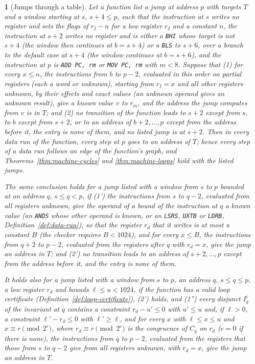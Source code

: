 \documentclass[oneside,english]{amsart}
\numberwithin{equation}{section}
\theoremstyle{plain}
\theoremstyle{definition}
\theoremstyle{plain}
\newtheorem{prop}[thm]{\protect\propositionname}
\theoremstyle{plain}
\theoremstyle{remark}
\providecommand{\propositionname}{Proposition}
\begin{document}
\begin{prop}[Jumps through a table]
\label{prop:jump-table}
Let a function list a jump at address $p$ with targets $T$ and a window starting at $s$, $s + 4 \le p$, such that the instruction at $s$ writes no register and sets the flags of $r_I - n$ for a low register $r_I$ and a constant $n$, the instruction at $s + 2$ writes no register and is either a \texttt{BHI} whose target is not $s + 4$ (the window then continues at $b = s + 4$) or a \texttt{BLS} to $s + 6$, over a branch to the default case at $s + 4$ (the window continues at $b = s + 6$), and the instruction at $p$ is \texttt{ADD PC, rm} or \texttt{MOV PC, rm} with $m < 8$. Suppose that (1) for every $x \le n$, the instructions from $b$ to $p - 2$, evaluated in this order on partial registers (each a word or unknown), starting from $r_I = x$ and all other registers unknown, by their effects and exact values (an unknown operand gives an unknown result), give a known value $v$ to $r_m$, and the address the jump computes from $v$ is in $T$; and (2) no transition of the function leads to $s + 2$ except from $s$, to $b$ except from $s + 2$, or to an address of $b + 2, \dots, p$ except from the address before it, the entry is none of them, and no listed jump is at $s + 2$. Then in every data run of the function, every step at $p$ goes to an address of $T$; hence every step of a data run follows an edge of the function's graph, and Theorems~\ref{thm:machine-cycles} and \ref{thm:machine-loops} hold with the listed jumps.

The same conclusion holds for a jump listed with a window from $s$ to $p$ bounded at an address $q$, $s \le q < p$, if (1') the instructions from $s$ to $q - 2$, evaluated from all registers unknown, give the operand of a bound of the instruction at $q$ a known value (an \texttt{ANDS} whose other operand is known, or an \texttt{LSRS}, \texttt{UXTB} or \texttt{LDRB}, Definition~\ref{def:data-run}), so that the register $r_d$ that it writes is at most a constant $B$ (the checker requires $B < 1024$), and for every $x \le B$, the instructions from $q + 2$ to $p - 2$, evaluated from the registers after $q$ with $r_d = x$, give the jump an address in $T$; and (2') no transition leads to an address of $s + 2, \dots, p$ except from the address before it, and the entry is none of them.

It holds also for a jump listed with a window from $s$ to $p$, an address $q$, $s \le q \le p$, a low register $r_d$ and bounds $\ell \le u < 1024$, if the function has a valid loop certificate (Definition~\ref{def:loop-certificate}), (2') holds, and (1'') every disjunct $I_q^i$ of the invariant at $q$ contains a constraint $r_d - u' \le 0$ with $u' \le u$ and, if $\ell > 0$, a constraint $\ell' - r_d \le 0$ with $\ell' \ge \ell$, and for every $x$ with $\ell \le x \le u$ and $x \equiv r \pmod{2^e}$, where $r_d \equiv r \pmod{2^e}$ is the congruence of $C_q$ on $r_d$ ($e = 0$ if there is none), the instructions from $q$ to $p - 2$, evaluated from the registers that those from $s$ to $q - 2$ give from all registers unknown, with $r_d = x$, give the jump an address in $T$.
\end{prop}
\end{document}
